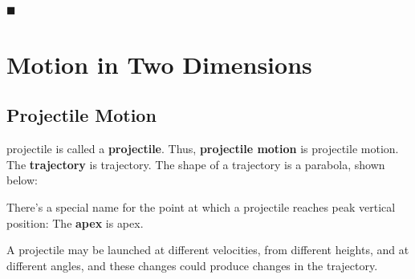 \documentclass[dvipsnames]{article}
\newif\ifShowUnitVII
\begin{document}
\hfill $\blacksquare$


\fi

\clearpage

\section{Motion in Two Dimensions}

\ifShowUnitVII

\subsection{Projectile Motion}


\Glsdesc{projectile} is called a \textbf{\gls{projectile}}. Thus, \textbf{\gls{projectile motion}} is \glsdesc{projectile motion}. The \textbf{\gls{trajectory}} is \glsdesc{trajectory}. The shape of a trajectory is a parabola, shown below:

\begin{center}
\end{center}

There's a special name for the point at which a projectile reaches peak vertical position: The \textbf{\gls{apex}} is \glsdesc{apex}.


A projectile may be launched at different velocities, from different heights, and at different angles, and these changes could produce changes in the trajectory.
\end{document}
